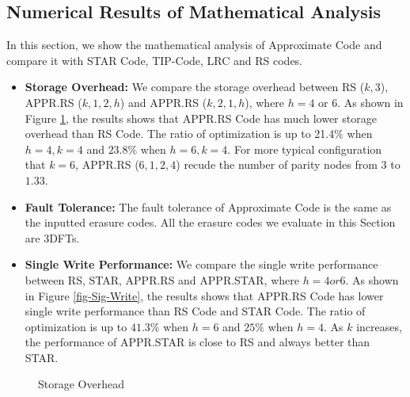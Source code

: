 \documentclass[sigconf]{acmart}
\begin{document}
\subsection{Numerical Results of Mathematical Analysis}
In this section, we show the mathematical analysis of Approximate Code and compare it with STAR Code, TIP-Code, LRC and RS codes.
\begin{itemize}
    \item \textbf{Storage Overhead:} We compare the storage overhead between RS ($k,3$), APPR.RS ($k,1,2,h$) and APPR.RS ($k,2,1,h$), where $h = 4$ or $6$. As shown in Figure \ref{fig-Storage}, the results shows that APPR.RS Code has much lower storage overhead than RS Code. The ratio of optimization is up to 21.4\% when $h=4, k=4$ and $23.8\%$ when $h=6, k=4$. For more typical configuration that $k=6$, APPR.RS ($6,1,2,4$) recude the number of parity nodes from $3$ to $1.33$.
    \item \textbf{Fault Tolerance:} The fault tolerance of Approximate Code is the same as the inputted erasure codes. All the erasure codes we evaluate in this Section are 3DFTs.
    \item \textbf{Single Write Performance:} We compare the single write performance between RS, STAR, APPR.RS and APPR.STAR, where $h = 4 or 6$. As shown in Figure \ref{fig-Sig-Write}, the results shows that APPR.RS Code has lower single write performance than RS Code and STAR Code. The ratio of optimization is up to $41.3\%$ when $h=6$ and $25\%$ when $h=4$. As $k$ increases, the performance of APPR.STAR is close to RS and always better than STAR.
\end{itemize}

\begin{figure}[ht]
\caption{Storage Overhead}\label{fig-Storage}
\end{figure}
\end{document}
